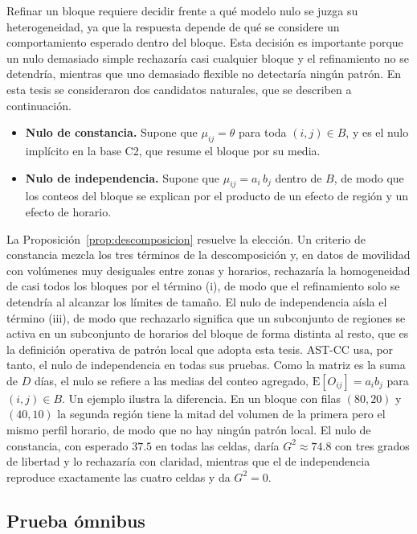 Refinar un bloque requiere decidir frente a qué modelo nulo se juzga su
heterogeneidad, ya que la respuesta depende de qué se considere un comportamiento
esperado dentro del bloque. Esta decisión es importante porque un nulo
demasiado simple rechazaría casi cualquier bloque y el refinamiento no se
detendría, mientras que uno demasiado flexible no detectaría ningún patrón. En
esta tesis se consideraron dos candidatos naturales, que se describen a
continuación.

\begin{itemize}
  \item \textbf{Nulo de constancia.} Supone que $\mu_{ij}=\theta$ para toda
  $(i,j)\in B$, y es el nulo implícito en la base C2, que resume el bloque por
  su media.
  \item \textbf{Nulo de independencia.} Supone que $\mu_{ij} = a_i\, b_j$ dentro de
  $B$, de modo que los conteos del bloque se explican por el producto de un efecto
  de región y un efecto de horario.
\end{itemize}

La Proposición~\ref{prop:descomposicion} resuelve la elección. Un criterio de
constancia mezcla los tres términos de la descomposición y, en datos de
movilidad con volúmenes muy desiguales entre zonas y horarios, rechazaría la
homogeneidad de casi todos los bloques por el término (i), de modo que el
refinamiento solo se detendría al alcanzar los límites de tamaño. El nulo de
independencia aísla el término (iii), de modo que rechazarlo significa que un subconjunto de
regiones se activa en un subconjunto de horarios del bloque de forma distinta
al resto, que es la definición operativa de patrón local que adopta esta
tesis. AST-CC usa, por tanto, el nulo de independencia en todas sus pruebas.
Como la matriz es la suma de $D$ días, el nulo se refiere a las medias del
conteo agregado, $\mathrm{E}[O_{ij}] = a_i b_j$ para $(i,j)\in B$. Un ejemplo
ilustra la diferencia. En un bloque con filas $(80,20)$ y $(40,10)$ la segunda
región tiene la mitad del volumen de la primera pero el mismo perfil horario, de
modo que no hay ningún patrón local. El nulo de constancia, con esperado $37.5$ en
todas las celdas, daría $G^2\approx 74.8$ con tres grados de libertad y lo
rechazaría con claridad, mientras que el de independencia reproduce exactamente
las cuatro celdas y da $G^2 = 0$.

\subsection{Prueba ómnibus}

